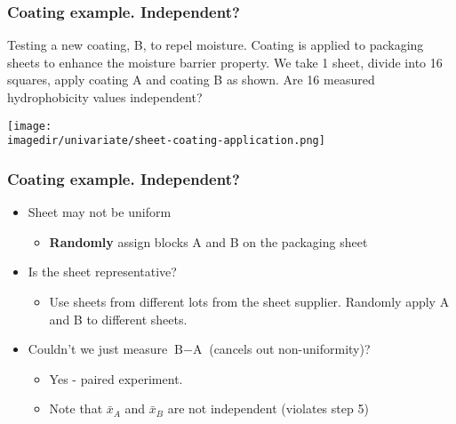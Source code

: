 \begin{frame}\frametitle{{\color{myOrange}{Side discussion:}} Coating example. Independent?}

	Testing a new coating, B, to repel moisture. Coating is applied to packaging sheets to enhance the moisture barrier property. We take 1 sheet, divide into 16 squares, apply coating A and coating B as shown. Are 16 measured hydrophobicity values independent?
	\begin{center}
		\texttt{[image: \\imagedir/univariate/sheet-coating-application.png]}
	\end{center}
\end{frame}

\begin{frame}\frametitle{{\color{myOrange}{Side discussion:}} Coating example. Independent?}
	\begin{itemize}
		\item	Sheet may not be uniform
		\begin{itemize}
			\item	\textbf{Randomly} assign blocks A and B on the packaging sheet 
		\end{itemize}
		\item	Is the sheet representative?
		\begin{itemize}
			\item	Use sheets from different lots from the sheet supplier. Randomly apply A and B to different sheets.
		\end{itemize}
		\item	Couldn't we just measure $\text{B} - \text{A}$ (cancels out non-uniformity)?
		\begin{itemize}
			\item	Yes - paired experiment.
			\item	Note that $\bar{x}_A$ and $\bar{x}_B$ are not independent (violates step 5)
		\end{itemize}
	\end{itemize}
\end{frame}

